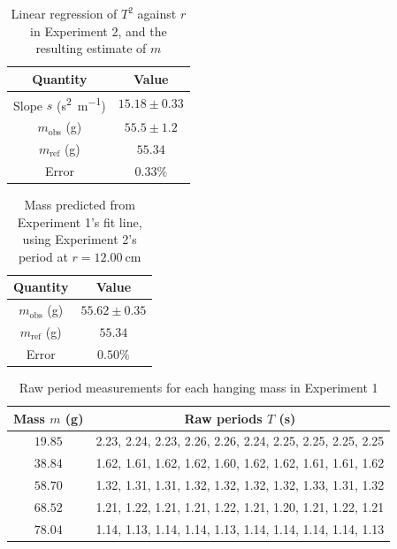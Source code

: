 \begin{table}[htb!]
\centering
\caption{Linear regression of $T^{2}$ against $r$ in Experiment 2, and the resulting estimate of $m$}
\begin{tabular}{cc}
\toprule
Quantity & Value \\
\midrule
Slope $s$ (\unit{\s\squared\per\m}) & $15.18 \pm 0.33$ \\
$m_{\text{obs}}$ (\unit{\g}) & $55.5 \pm 1.2$ \\
$m_{\text{ref}}$ (\unit{\g}) & $55.34$ \\
Error & $0.33\%$ \\
\bottomrule
\end{tabular}
\end{table}
\begin{table}[htb!]
\centering
\caption{Mass predicted from Experiment 1's fit line, using Experiment 2's period at $r=\qty{12.00}{\cm}$}
\begin{tabular}{cc}
\toprule
Quantity & Value \\
\midrule
$m_{\text{obs}}$ (\unit{\g}) & $55.62 \pm 0.35$ \\
$m_{\text{ref}}$ (\unit{\g}) & $55.34$ \\
Error & $0.50\%$ \\
\bottomrule
\end{tabular}
\end{table}
\begin{table}[htb!]
\centering
\caption{Raw period measurements for each hanging mass in Experiment 1}
\begin{tabular}{cc}
\toprule
Mass $m$ (\unit{\g}) & Raw periods $T$ (\unit{\s}) \\
\midrule
$19.85$ & 2.23, 2.24, 2.23, 2.26, 2.26, 2.24, 2.25, 2.25, 2.25, 2.25 \\
$38.84$ & 1.62, 1.61, 1.62, 1.62, 1.60, 1.62, 1.62, 1.61, 1.61, 1.62 \\
$58.70$ & 1.32, 1.31, 1.31, 1.32, 1.32, 1.32, 1.32, 1.33, 1.31, 1.32 \\
$68.52$ & 1.21, 1.22, 1.21, 1.21, 1.22, 1.21, 1.20, 1.21, 1.22, 1.21 \\
$78.04$ & 1.14, 1.13, 1.14, 1.14, 1.13, 1.14, 1.14, 1.14, 1.14, 1.13 \\
\bottomrule
\end{tabular}
\end{table}
